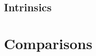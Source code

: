 \documentclass[12pt, a4paper]{article}
\begin{document}
\subsection{Intrinsics}

\section{Comparisons}
\end{document}
